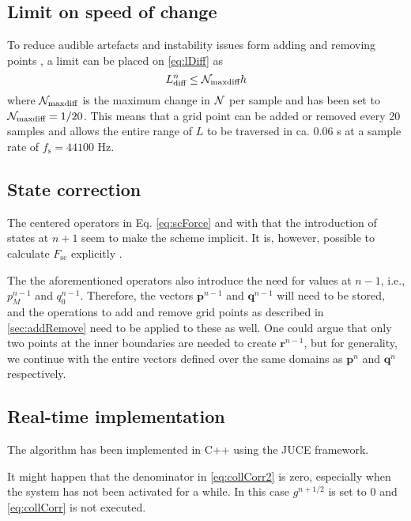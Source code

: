 \subsection{Limit on speed of change}\label{sec:limit}
To reduce audible artefacts and instability issues form adding and removing points , a limit can be placed on \eqref{eq:lDiff} as
\begin{equation}\label{eq:Nmaxdiff} 
    L_\text{diff}^n \leq \mathcal{N}_\text{maxdiff} h
\end{equation}
where $\mathcal{N}_\text{maxdiff}$ is the maximum change in $\mathcal{N}$ per sample and has been set to $\mathcal{N}_\text{maxdiff} = 1/20$. This means that a grid point can be added or removed every 20 samples and allows the entire range of $L$ to be traversed in ca. 0.06 s at a sample rate of $f_\text{s} = 44100$ Hz. 

\subsection{State correction}\label{sec:impStateCorr}
The centered operators in Eq. \eqref{eq:scForce} and with that the introduction of states at $n+1$ seem to make the scheme implicit. It is, however, possible to calculate $F_\text{sc}$ explicitly \cite{bilbao2009, bilbao2009dafx}.

The the aforementioned operators also introduce the need for values at $n-1$, i.e., $p_{M}^{n-1}$ and $q_{0}^{n-1}$. Therefore, the vectors $\mathbf{p}^{n-1}$ and $\mathbf{q}^{n-1}$ will need to be stored, and the operations to add and remove grid points as described in \ref{sec:addRemove} need to be applied to these as well. One could argue that only two points at the inner boundaries are needed to create $\mathbf{r}^{n-1}$, but for generality, we continue with the entire vectors defined over the same domains as $\mathbf{p}^n$ and $\mathbf{q}^{n}$ respectively. 


\subsection{Real-time implementation}
The algorithm has been implemented in C++ using the JUCE framework. 

It might happen that the denominator in \eqref{eq:collCorr2} is zero, especially when the system has not been activated for a while. In this case $g^{n+1/2}$ is set to 0 and \eqref{eq:collCorr} is not executed.

